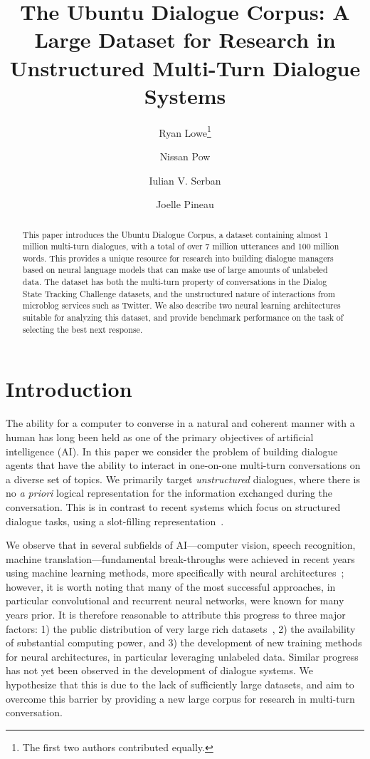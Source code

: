 \documentclass[11pt,a4paper]{article}
\title{The Ubuntu Dialogue Corpus: A Large Dataset for Research in Unstructured Multi-Turn Dialogue Systems}
\author[*]{Ryan Lowe\thanks{ The first two authors contributed equally.}}
\author[*]{Nissan Pow}
\author[$\dag$]{Iulian V. Serban}
\author[*]{Joelle Pineau}
\affil[*]{School of Computer Science, McGill University, Montreal, Canada}
\affil[$\dag$]{Department of Computer Science and Operations Research, Universi{\'e} de Montr{\'e}al, Montreal, Canada}
\begin{document}
\maketitle

\begin{abstract}
This paper introduces the Ubuntu Dialogue Corpus, a dataset containing almost 1 million multi-turn dialogues, with a total of over 7 million utterances and 100 million words. This provides a unique resource for research into building dialogue managers based on neural language models that can make use of large amounts of unlabeled data.  The dataset has both the multi-turn property of conversations in the Dialog State Tracking Challenge datasets, and the unstructured nature of interactions from microblog services such as Twitter. We also describe two neural learning architectures suitable for analyzing this dataset, and provide benchmark performance on the task of selecting the best next response.
\end{abstract}

\section{Introduction}

The ability for a computer to converse in a natural and coherent manner with a human has long been held as one of the primary objectives of artificial intelligence (AI). In this paper we consider the problem of building dialogue agents that have the ability to interact in one-on-one multi-turn conversations on a diverse set of topics. We primarily target \emph{unstructured} dialogues, where there is no \emph{a priori} logical representation for the information exchanged during the conversation.  This is in contrast to recent systems which focus on structured dialogue tasks, using a slot-filling representation~\cite{williams2013dialog,henderson2014second,singh02}.

We observe that in several subfields of AI---computer vision, speech recognition, machine translation---fundamental break-throughs were achieved in recent years using machine learning methods, more specifically with neural architectures~\cite{bengio2013representation}; however, it is worth noting that many of the most successful approaches, in particular convolutional and recurrent neural networks, were known for many years prior. It is therefore reasonable to attribute this progress to three major factors:  1) the public distribution of very large rich datasets~\cite{deng2009imagenet}, 2) the availability of substantial computing power, and 3) the development of new training methods for neural architectures, in particular leveraging unlabeled data.  Similar progress has not yet been observed in the development of dialogue systems. We hypothesize that this is due to the lack of sufficiently large datasets, and aim to overcome this barrier by providing a new large corpus for research in multi-turn conversation.
\end{document}
